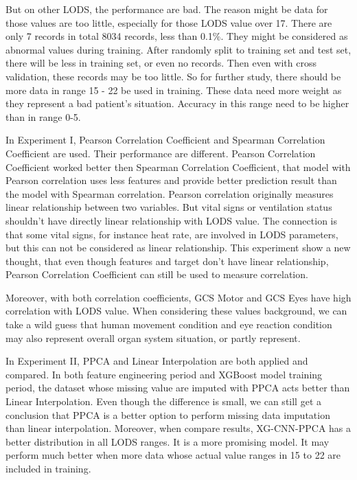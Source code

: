 \documentclass[12pt,a4paper,english
]{tunithesis}
\begin{document}
But on other LODS, the performance are bad. The reason might be data for those values are too little, especially for those LODS value over 17. There are only 7 records in total 8034 records, less than 0.1\%. They might be considered as abnormal values during training. After randomly split to training set and test set, there will be less in training set, or even no records. Then even with cross validation, these records may be too little. So for further study, there should be more data in range 15 - 22 be used in training. These data need more weight as they represent a bad patient's situation. Accuracy in this range need to be higher than in range 0-5.

In Experiment I, Pearson Correlation Coefficient and Spearman Correlation Coefficient are used. Their performance are different. Pearson Correlation Coefficient worked better then Spearman Correlation Coefficient, that model with Pearson correlation uses less features and provide better prediction result than the model with Spearman correlation. Pearson correlation originally measures linear relationship between two variables. But vital signs or ventilation status shouldn't have directly linear relationship with LODS value. The connection is that some vital signs, for instance heat rate, are involved in LODS parameters, but this can not be considered as linear relationship. This experiment show a new thought, that even though features and target don't have linear relationship, Pearson Correlation Coefficient can still be used to measure correlation.

Moreover, with both correlation coefficients, GCS Motor and GCS Eyes have high correlation with LODS value. When considering these values background, we can take a wild guess that human movement condition and eye reaction condition may also represent overall organ system situation, or partly represent. 

In Experiment II, PPCA and Linear Interpolation are both applied and compared. In both feature engineering  period and XGBoost model training period, the dataset whose missing value are imputed with PPCA acts better than Linear Interpolation. Even though the difference is small, we can still get a conclusion that PPCA is a better option to perform missing data imputation than linear interpolation. Moreover, when compare results, XG-CNN-PPCA has a better distribution in all LODS ranges. It is a more promising model. It may perform much better when more data whose actual value ranges in 15 to 22 are included in training.
\end{document}
